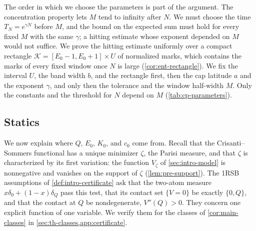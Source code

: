 The order in which we choose the parameters is part of the argument. The concentration property lets $M$ tend to infinity after $N$. We must choose the time $T_N=e^{\gamma N}$ before $M$, and the bound on the expected sum must hold for every fixed $M$ with the same $\gamma$; a hitting estimate whose exponent depended on $M$ would not suffice. We prove the hitting estimate uniformly over a compact rectangle $\mathcal K=[E_0-1,E_0+1]\times U$ of normalized marks, which contains the marks of every fixed window once $N$ is large (\cref{cor:ent-rectangle}). We fix the interval $U$, the band width $b$, and the rectangle first, then the cap latitude $a$ and the exponent $\gamma$, and only then the tolerance and the window half-width $M$. Only the constants and the threshold for $N$ depend on $M$ (\cref{tab:cp-parameters}).

\subsection{Statics}\label{sec:ov-thermal}

We now explain where $Q$, $E_0$, $K_0$, and $c_0$ come from. Recall that the Crisanti--Sommers functional has a unique minimizer $\zeta$, the Parisi measure, and that $\zeta$ is characterized by its first variation: the function $V_\zeta$ of \cref{sec:intro-model} is nonnegative and vanishes on the support of $\zeta$ (\cref{lem:pre-support}). The 1RSB assumptions of \cref{def:intro-certificate} ask that the two-atom measure $x\delta_0+(1-x)\delta_Q$ pass this test, that its contact set $\{V=0\}$ be exactly $\{0,Q\}$, and that the contact at $Q$ be nondegenerate, $V''(Q)>0$. They concern one explicit function of one variable. We verify them for the classes of \cref{cor:main-classes} in \cref{sec:th-classes,app:certificate}.

